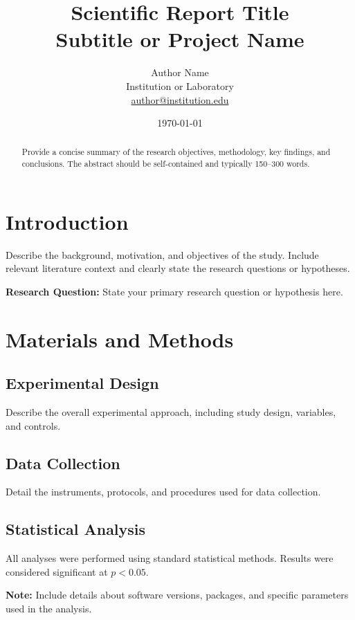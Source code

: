 \documentclass[11pt]{report}
\title{\textbf{Scientific Report Title}\\[0.5em]
\large Subtitle or Project Name}
\author{Author Name\\
\small Institution or Laboratory\\
\small \href{mailto:author@institution.edu}{author@institution.edu}}
\date{\today}
\begin{document}
\maketitle

\begin{abstract}
Provide a concise summary of the research objectives, methodology, key findings, and conclusions. The abstract should be self-contained and typically 150--300 words.
\end{abstract}

\tableofcontents

\chapter{Introduction}

Describe the background, motivation, and objectives of the study. Include relevant literature context and clearly state the research questions or hypotheses.

\begin{highlight}
\textbf{Research Question:} State your primary research question or hypothesis here.
\end{highlight}

\chapter{Materials and Methods}

\section{Experimental Design}

Describe the overall experimental approach, including study design, variables, and controls.

\section{Data Collection}

Detail the instruments, protocols, and procedures used for data collection.

\section{Statistical Analysis}

All analyses were performed using standard statistical methods. Results were considered significant at $p < 0.05$.

\begin{note}
\textbf{Note:} Include details about software versions, packages, and specific parameters used in the analysis.
\end{note}
\end{document}
